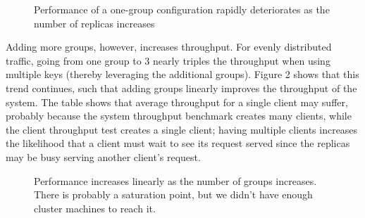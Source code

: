 \documentclass[letterpaper,10pt]{article}
\begin{document}
\begin{figure}[h]
\centering
{}
\caption{Performance of a one-group configuration rapidly deteriorates as the number of replicas increases}
\label{fig:replicas}
\end{figure}

Adding more groups, however, increases throughput.  For evenly distributed traffic, going from one group to 3 nearly triples the throughput when using multiple keys (thereby leveraging the additional groups).  Figure 2 shows that this trend continues, such that adding groups linearly improves the throughput of the system. The table shows that average throughput for a single client may suffer, probably because the system throughput benchmark creates many clients, while the client throughput test creates a single client; having multiple clients increases the likelihood that a client must wait to see its request served since the replicas may be busy serving another client's request.

\begin{figure}[h]
\centering
{}
\caption{Performance increases linearly as the number of groups increases. There is probably a saturation point, but we didn't have enough cluster machines to reach it.}
\label{fig:groups}
\end{figure}
\end{document}
